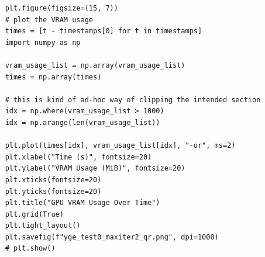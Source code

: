 \begin{verbatim}
    plt.figure(figsize=(15, 7))
    # plot the VRAM usage
    times = [t - timestamps[0] for t in timestamps]
    import numpy as np

    vram_usage_list = np.array(vram_usage_list)
    times = np.array(times)

    # this is kind of ad-hoc way of clipping the intended section
    idx = np.where(vram_usage_list > 1000)
    idx = np.arange(len(vram_usage_list))

    plt.plot(times[idx], vram_usage_list[idx], "-or", ms=2)
    plt.xlabel("Time (s)", fontsize=20)
    plt.ylabel("VRAM Usage (MiB)", fontsize=20)
    plt.xticks(fontsize=20)
    plt.yticks(fontsize=20)
    plt.title("GPU VRAM Usage Over Time")
    plt.grid(True)
    plt.tight_layout()
    plt.savefig(f"yge_test0_maxiter2_qr.png", dpi=1000)
    # plt.show()
\end{verbatim}